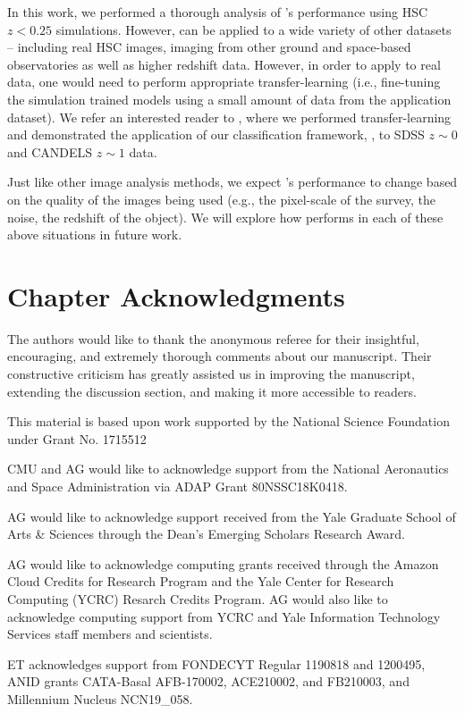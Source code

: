 In this work, we performed a thorough analysis of \gampen{}'s performance using HSC $z < 0.25$ simulations. However, \gampen{} can be applied to a wide variety of other datasets -- including real HSC images, imaging from other ground and space-based observatories as well as higher redshift data. However, in order to apply \gampen{} to real data, one would need to perform appropriate transfer-learning (i.e., fine-tuning the simulation trained \gampen{} models using a small amount of data from the application dataset). We refer an interested reader to \citet{Ghosh2020GalaxyGalaxies}, where we performed transfer-learning and demonstrated the application of our classification framework, \gamornet{}, to SDSS $z\sim0$ and CANDELS $z\sim1$ data.
    
Just like other image analysis methods, we expect \gampen{}'s performance to change based on the quality of the images being used (e.g., the pixel-scale of the survey, the noise, the redshift of the object). We will explore how \gampen{} performs in each of these above situations in future work.

\section*{Chapter Acknowledgments}

The authors would like to thank the anonymous referee for their insightful, encouraging, and extremely thorough comments about our manuscript.  Their constructive criticism has greatly assisted us in improving the manuscript, extending the discussion section, and making it more accessible to readers.

This material is based upon work supported by the National Science Foundation under Grant No. 1715512

CMU and AG would like to acknowledge support from the National Aeronautics and Space Administration via ADAP Grant 80NSSC18K0418. 

AG would like to acknowledge support received from the Yale Graduate School of Arts \& Sciences through the Dean's Emerging Scholars Research Award.

AG would like to acknowledge computing grants received through the Amazon Cloud Credits for Research Program and the Yale Center for Research Computing (YCRC) Resarch Credits Program. AG would also like to acknowledge computing support from YCRC and Yale Information Technology Services staff members and scientists. 

ET acknowledges support from FONDECYT Regular 1190818 and 1200495, ANID grants CATA-Basal AFB-170002, ACE210002, and FB210003, and Millennium Nucleus NCN19\_058.

